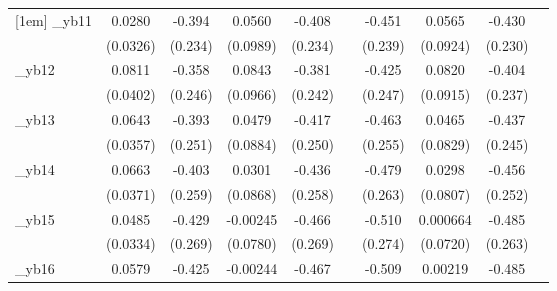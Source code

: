 \begin{table}[htbp]
\begin{tabular}{l*{9}{c}}
[1em]
\_yb11       &      0.0280         &      -0.394\sym{*}  &      0.0560         &      -0.408\sym{*}  &                     &      -0.451\sym{*}  &      0.0565         &      -0.430\sym{*}  &                     \\
            &    (0.0326)         &     (0.234)         &    (0.0989)         &     (0.234)         &                     &     (0.239)         &    (0.0924)         &     (0.230)         &                     \\
[1em]
\_yb12       &      0.0811\sym{**} &      -0.358         &      0.0843         &      -0.381         &                     &      -0.425\sym{*}  &      0.0820         &      -0.404\sym{*}  &                     \\
            &    (0.0402)         &     (0.246)         &    (0.0966)         &     (0.242)         &                     &     (0.247)         &    (0.0915)         &     (0.237)         &                     \\
[1em]
\_yb13       &      0.0643\sym{*}  &      -0.393         &      0.0479         &      -0.417\sym{*}  &                     &      -0.463\sym{*}  &      0.0465         &      -0.437\sym{*}  &                     \\
            &    (0.0357)         &     (0.251)         &    (0.0884)         &     (0.250)         &                     &     (0.255)         &    (0.0829)         &     (0.245)         &                     \\
[1em]
\_yb14       &      0.0663\sym{*}  &      -0.403         &      0.0301         &      -0.436\sym{*}  &                     &      -0.479\sym{*}  &      0.0298         &      -0.456\sym{*}  &                     \\
            &    (0.0371)         &     (0.259)         &    (0.0868)         &     (0.258)         &                     &     (0.263)         &    (0.0807)         &     (0.252)         &                     \\
[1em]
\_yb15       &      0.0485         &      -0.429         &    -0.00245         &      -0.466\sym{*}  &                     &      -0.510\sym{*}  &    0.000664         &      -0.485\sym{*}  &                     \\
            &    (0.0334)         &     (0.269)         &    (0.0780)         &     (0.269)         &                     &     (0.274)         &    (0.0720)         &     (0.263)         &                     \\
[1em]
\_yb16       &      0.0579         &      -0.425         &    -0.00244         &      -0.467\sym{*}  &                     &      -0.509\sym{*}  &     0.00219         &      -0.485\sym{*}  &                     \\

\end{tabular}
\end{table}
